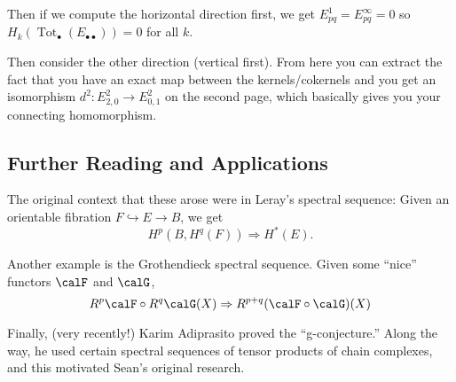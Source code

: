 \documentclass[12pt]{article}
\begin{document}
Then if we compute the horizontal direction first, we get $E_{pq}^1=E_{pq}^\infty=0$ so $H_k(\operatorname{Tot}_\bullet(E_{\bullet\bullet}))=0$ for all $k$.

Then consider the other direction (vertical first). From here you can extract the fact that you have an exact map between the kernels/cokernels 
and you get an isomorphism $d^2:E_{2,0}^2\to E_{0,1}^2$ on the second page, which basically gives you your connecting homomorphism.

\subsection{Further Reading and Applications}
The original context that these arose were in Leray's spectral sequence: Given an orientable fibration $F\hookrightarrow E\to B$, 
we get 
\[H^p(B,H^q(F))\Rightarrow H^\ast(E).\]

Another example is the Grothendieck spectral sequence. Given some ``nice'' functors $\calF$ and $\calG$, 
\[R^p\calF\circ R^q\calG(X)\Rightarrow R^{p+q}(\calF\circ \calG)(X)\]

Finally, (very recently!) Karim Adiprasito proved the ``g-conjecture.'' Along the way, he used certain spectral sequences 
of tensor products of chain complexes, and this motivated Sean's original research.



\newpage
\end{document}
